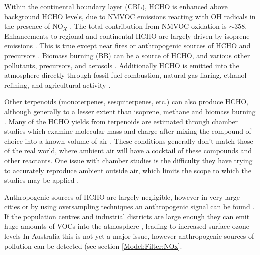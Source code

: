     Within the continental boundary layer (CBL), HCHO is enhanced above background HCHO levels, due to NMVOC emissions reacting with OH radicals in the presence of NO$_X$ \parencite{Wagner2002, Millet2006, Kefauver2014}.
    The total contribution from NMVOC oxidation is $\sim 358$\tgpyr \parencite{FortemsCheiney2012}.
    Enhancements to regional and continental HCHO are largely driven by isoprene emissions \parencite{Guenther1995,Palmer2003, Shim2005, Kefauver2014}.
    This is true except near fires or anthropogenic sources of HCHO and precursors \parencite{Guenther1995, Kefauver2014, Wolfe2016}.
    Biomass burning (BB) can be a source of HCHO, and various other pollutants, precursors, and aerosols \parencite{Guenther1995, Andreae2001}.
    Additionally HCHO is emitted into the atmosphere directly through fossil fuel combustion, natural gas flaring, ethanol refining, and agricultural activity \parencite{Wolfe2016}.
    
    Other terpenoids (monoterpenes, sesquiterpenes, etc.) can also produce HCHO, although generally to a lesser extent than isoprene, methane and biomass burning \parencite{Guenther2012}.
    Many of the HCHO yields from terpenoids are estimated through chamber studies which examine molecular mass and charge after mixing the compound of choice into a known volume of air \parencite[eg.][]{Nguyen2014}.
    These conditions generally don't match those of the real world, where ambient air will have a cocktail of these compounds and other reactants.
    One issue with chamber studies is the difficulty they have trying to accurately reproduce ambient outside air, which limits the scope to which the studies may be applied \parencite{Nguyen2014}.
    
    Anthropogenic sources of HCHO are largely negligible, however in very large cities or by using oversampling techniques an anthropogenic signal can be found \parencite{Millet2008,Zhu2014}.
    If the population centres and industrial districts are large enough they can emit huge amounts of VOCs into the atmosphere \parencite{Fu2007}, leading to increased surface ozone levels \parencite{Zhu2014}
    In Australia this is not yet a major issue, however anthropogenic sources of pollution can be detected (see section \ref{Model:Filter:NOx}.
    
